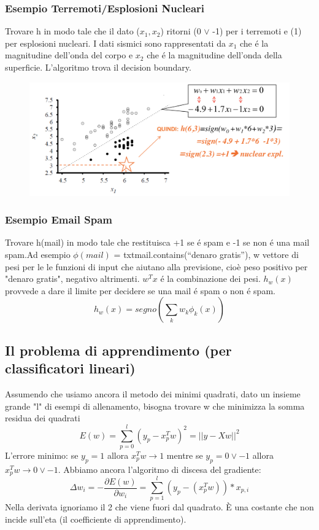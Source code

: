\documentclass{article}
\begin{document}
\subsubsection{Esempio Terremoti/Esplosioni Nucleari}
Trovare h in modo tale che il dato ($x_1, x_2$) ritorni (0 $\lor$ -1) per i terremoti e (1) per esplosioni nucleari. I dati sismici sono rappresentati da $x_1$ che é la magnitudine dell'onda del corpo e $x_2$ che é la magnitudine dell'onda della superficie. L'algoritmo trova il decision boundary.
\begin{figure}[H]
\centering
\includegraphics[scale=0.4]{Images/magnitudegraph.png}
\end{figure}

\subsubsection{Esempio Email Spam}
Trovare h(mail) in modo tale che restituisca +1 se é spam e -1 se non é una mail spam.\newline  Ad esempio $\phi(mail)$ = txtmail.contains(“denaro gratis”), w vettore di pesi per le le funzioni di input che aiutano alla previsione, cioè peso positivo per "denaro gratis", negativo altrimenti. $w^Tx$ é la combinazione dei pesi. $h_w(x)$ provvede a dare il limite per decidere se una mail é spam o non é spam.
\begin{equation}
    h_w(x)= segno(\sum_{k} w_k\phi_k(x))
\end{equation}

\subsection{Il problema di apprendimento (per classificatori lineari)}
Assumendo che usiamo ancora il metodo dei minimi quadrati, dato un insieme grande "l" di esempi di allenamento, bisogna trovare w che minimizza la somma residua dei quadrati
\begin{equation}
    E(w)=\sum_{p = 0}^l(y_p-x_p^Tw)^2=||y-Xw||^2
\end{equation}
L'errore minimo: se $y_p=1$ allora $x_p^Tw \rightarrow 1$ mentre se $y_p=0\lor -1$ allora $x_p^Tw \rightarrow 0 \lor -1$. \newline 
Abbiamo ancora l'algoritmo di discesa del gradiente:
\begin{equation}
    \Delta w_i = - \frac{\partial E(w)}{\partial w_i} = \sum_{p=1}^l (y_p - (x_p^Tw)) * x_{p,i}
\end{equation}
Nella derivata ignoriamo il 2 che viene fuori dal quadrato. È una costante che non incide sull'eta (il coefficiente di apprendimento).
\end{document}
